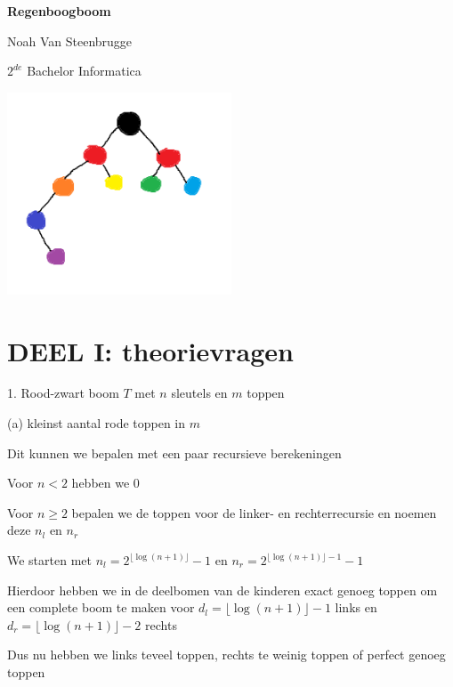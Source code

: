 \documentclass{article}
\begin{document}
\begin{titlepage}
    \centering
    
    \Huge \textbf{Regenboogboom}
    \vspace{1cm}
    
    \Large Noah Van Steenbrugge
    
    \large $2^{de}$ Bachelor Informatica
    \vspace{5cm}

    \includegraphics[width=0.5\textwidth]{regenboogboom.png}
\end{titlepage}

\newpage
\setcounter{page}{1}

\section*{\centering DEEL I: theorievragen}
\vspace{1cm}

\Large 1. Rood-zwart boom $T$ met $n$ sleutels en $m$ toppen
\vspace{0.5cm}

\Large (a) kleinst aantal rode toppen in $m$
\vspace{0.3cm}

\large
Dit kunnen we bepalen met een paar recursieve berekeningen

Voor $n < 2$ hebben we 0

Voor $n \geq 2$ bepalen we de toppen voor de linker- en rechterrecursie en noemen deze $n_l$ en $n_r$

We starten met $n_l = 2^{\lfloor \log(n+1) \rfloor} - 1$ en $n_r = 2^{\lfloor \log(n+1) \rfloor - 1} - 1$

Hierdoor hebben we in de deelbomen van de kinderen exact genoeg toppen om een complete boom te maken voor $d_l = \lfloor \log(n+1) \rfloor - 1$ links en $d_r = \lfloor \log(n+1) \rfloor - 2$ rechts

Dus nu hebben we links teveel toppen, rechts te weinig toppen of perfect genoeg toppen
\end{document}
